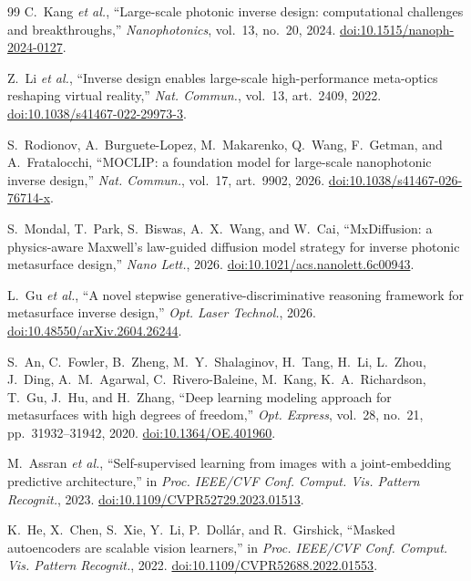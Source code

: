 \documentclass[pdflatex,oneside,sn-mathphys-num]{sn-jnl}
\theoremstyle{thmstyleone}
\theoremstyle{thmstyletwo}
\theoremstyle{thmstylethree}
\begin{document}
\begin{thebibliography}{99}
 C.~Kang \emph{et al.}, ``Large-scale photonic inverse design:
computational challenges and breakthroughs,'' \emph{Nanophotonics}, vol.~13, no.~20,
2024. \href{https://doi.org/10.1515/nanoph-2024-0127}{doi:10.1515/nanoph-2024-0127}.

 Z.~Li \emph{et al.}, ``Inverse design enables large-scale high-performance
meta-optics reshaping virtual reality,'' \emph{Nat. Commun.}, vol.~13, art.~2409, 2022.
\href{https://doi.org/10.1038/s41467-022-29973-3}{doi:10.1038/s41467-022-29973-3}.

 S.~Rodionov, A.~Burguete-Lopez, M.~Makarenko, Q.~Wang, F.~Getman, and
A.~Fratalocchi, ``MOCLIP: a foundation model for large-scale nanophotonic inverse
design,'' \emph{Nat. Commun.}, vol.~17, art.~9902, 2026.
\href{https://doi.org/10.1038/s41467-026-76714-x}{doi:10.1038/s41467-026-76714-x}.

 S.~Mondal, T.~Park, S.~Biswas, A.~X.~Wang, and W.~Cai, ``MxDiffusion: a
physics-aware Maxwell's law-guided diffusion model strategy for inverse photonic metasurface
design,'' \emph{Nano Lett.}, 2026.
\href{https://doi.org/10.1021/acs.nanolett.6c00943}{doi:10.1021/acs.nanolett.6c00943}.

 L.~Gu \emph{et al.}, ``A novel stepwise generative-discriminative reasoning
framework for metasurface inverse design,'' \emph{Opt. Laser Technol.}, 2026.
\href{https://doi.org/10.48550/arXiv.2604.26244}{doi:10.48550/arXiv.2604.26244}.

 S.~An, C.~Fowler, B.~Zheng, M.~Y.~Shalaginov, H.~Tang, H.~Li, L.~Zhou,
J.~Ding, A.~M.~Agarwal, C.~Rivero-Baleine, M.~Kang, K.~A.~Richardson, T.~Gu, J.~Hu, and
H.~Zhang, ``Deep learning modeling approach for metasurfaces with high degrees of freedom,''
\emph{Opt. Express}, vol.~28, no.~21, pp.~31932--31942, 2020.
\href{https://doi.org/10.1364/OE.401960}{doi:10.1364/OE.401960}.

 M.~Assran \emph{et al.}, ``Self-supervised learning from images with a
joint-embedding predictive architecture,'' in \emph{Proc. IEEE/CVF Conf. Comput. Vis.
Pattern Recognit.}, 2023. \href{https://doi.org/10.1109/CVPR52729.2023.01513}{doi:10.1109/CVPR52729.2023.01513}.

 K.~He, X.~Chen, S.~Xie, Y.~Li, P.~Doll\'ar, and R.~Girshick, ``Masked
autoencoders are scalable vision learners,'' in \emph{Proc. IEEE/CVF Conf. Comput.
Vis. Pattern Recognit.}, 2022. \href{https://doi.org/10.1109/CVPR52688.2022.01553}{doi:10.1109/CVPR52688.2022.01553}.


\end{thebibliography}
\end{document}
